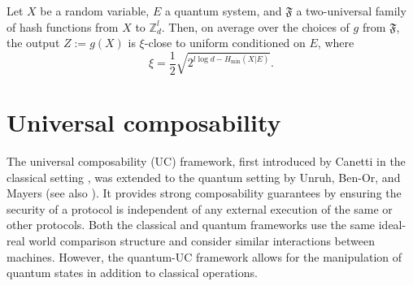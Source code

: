 
\begin{lemma}
Let $X$ be a random variable, $E$ a quantum system, and $\mathfrak{F}$ a two-universal family of hash functions from $X$ to $\mathbb{Z}_d^l$. Then, on average over the choices of $g$  from $\mathfrak{F}$, the output $Z := g(X)$ is $\xi$-close to uniform conditioned on $E$, where
\begin{equation}
  \xi = \frac{1}{2}\sqrt{2^{l\log d - H_\text{min}(X|E)}}.  
\end{equation}
 \label{lem:leftover}
\end{lemma}


\section{Universal composability}

The universal composability (UC) framework, first introduced by Canetti in the classical setting \cite{C20}, was extended to the quantum setting by Unruh, Ben-Or, and Mayers \cite{Unruh04, BenOrMay04} (see also \cite{Unruh10, FS09}). It provides strong composability guarantees by ensuring the security of a protocol is independent of any external execution of the same or other protocols. Both the classical and quantum frameworks use the same ideal-real world comparison structure and consider similar interactions between machines. However, the quantum-UC framework allows for the manipulation of quantum states in addition to classical operations.

